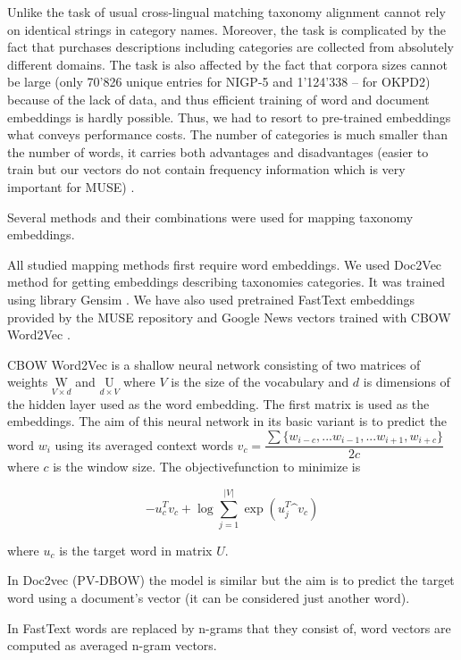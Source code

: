 \documentclass[conference]{IEEEtran}
\begin{document}
Unlike the task of usual cross-lingual matching taxonomy alignment cannot rely on identical strings in category names. Moreover, the task is complicated by the fact that purchases descriptions including categories are collected from absolutely different domains. The task is also affected by the fact that corpora sizes cannot be large (only 70'826 unique entries for NIGP-5 and 1'124'338 -- for OKPD2) because of the lack of data, and thus efficient training of word and document embeddings is hardly possible. Thus, we had to resort to pre-trained embeddings what conveys performance costs. The number of categories is much smaller than the number of words, it carries both advantages and disadvantages (easier to train but our vectors do not contain frequency information which is very important for MUSE) \cite{ruder-muse-limitations}.

Several methods and their combinations were used for mapping taxonomy embeddings.

All studied mapping methods first require word embeddings. We used Doc2Vec \cite{doc2vec} method for getting embeddings describing taxonomies categories. It was trained using library Gensim \cite{gensim}. We have also used pretrained FastText \cite{fasttext} embeddings provided by the MUSE repository and Google News vectors trained with CBOW Word2Vec \cite{mikolov2013}. 

CBOW Word2Vec is a shallow neural network consisting of two matrices of weights $\underset{V\times d}{\mathrm{W}}$ and $\underset{d\times V}{\mathrm{U}}$ where $V$ is the size of the vocabulary and $d$ is dimensions of the hidden layer used as the word embedding.
The first matrix is used as the embeddings.
The aim of this neural network in its basic variant is to predict the word $w_i$ using its averaged context words $v_c = \dfrac{\sum\{w_{i-c},...w_{i-1},...w_{i+1}, w_{i+c}\}}{2c}$ where $c$ is the window size. The objective\quad function to minimize is

$$-u_c^Tv_c + \log \sum_{j=1}^{|V|}\exp(u_j^T \^{v_c})$$

where $u_c$ is the target word in matrix $U$.

In Doc2vec (PV-DBOW) the model is similar but the aim is to predict the target word using a document's vector (it can be considered just another word).

In FastText words are replaced by n-grams that they consist of, word vectors are computed as averaged n-gram vectors.
\end{document}
